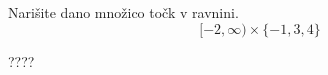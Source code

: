 \documentclass[addpoints]{exam}
\begin{document}
\begin{questions}
\begin{parts}

    \end{parts}
    
    


    





            

                        

                

    
    \question[4]
    Narišite dano množico točk v ravnini.
        $$[-2,\infty)\times \{-1,3,4\}$$

            \begin{solution}[2cm]
                ????
            \end{solution}




\end{questions}
\end{document}
